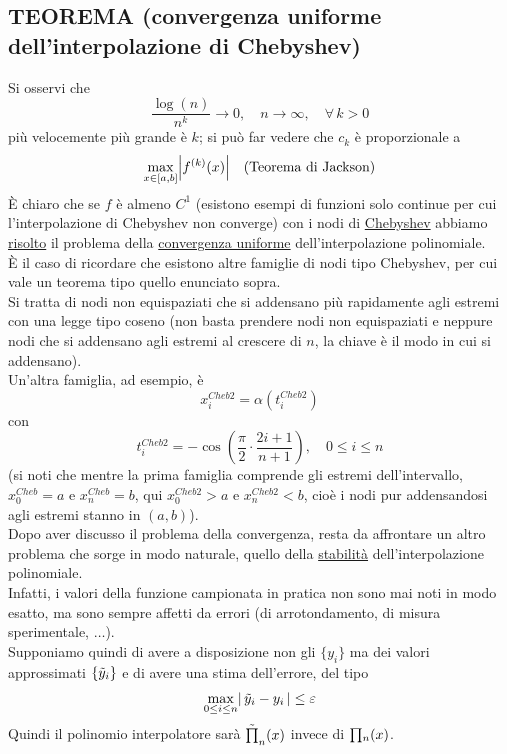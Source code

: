 \subsection{TEOREMA (convergenza uniforme dell'interpolazione di Chebyshev)}
\begin{center}
\end{center}
Si osservi che 
\[ \frac{\log (n)}{n^k} \to 0, \quad n \to \infty, \quad \forall \, k > 0 \]
più velocemente più grande è $k$; si può far vedere che $c_k$ è proporzionale a 
\[\max_{x \in [a,b]} \abs*{f^{(k)}(x)} \quad \text{(Teorema di Jackson)}\]
È chiaro che se $f$ è almeno $C^1$ (esistono esempi di funzioni solo continue per cui l'interpolazione di Chebyshev non converge) con i nodi di \uline{Chebyshev} abbiamo \uline{risolto} il problema della \uline{convergenza uniforme} dell'interpolazione polinomiale.\\
È il caso di ricordare che esistono altre famiglie di nodi tipo Chebyshev, per cui vale un teorema tipo quello enunciato sopra.\\
Si tratta di nodi non equispaziati che si addensano più rapidamente agli estremi con una legge tipo coseno (non basta prendere nodi non equispaziati e neppure nodi che si addensano agli estremi al crescere di $n$, la chiave è il modo in cui si addensano).\\
Un'altra famiglia, ad esempio, è
\[x_i^{Cheb2} = \alpha(t_i^{Cheb2})\] con
\[t_i^{Cheb2} = - \cos{\left(\frac{\pi}{2}\cdot \frac{2i+1}{n+1}\right)}, \quad 0 \le i \le n\]
(si noti che mentre la prima famiglia comprende gli estremi dell'intervallo, $x_0^{Cheb}=a$ e $x_n^{Cheb}=b$, qui $x_0^{Cheb2}>a$ e $x_n^{Cheb2}<b$, cioè i nodi pur addensandosi agli estremi stanno in $(a,b)$).\\
Dopo aver discusso il problema della convergenza, resta da affrontare un altro problema che sorge in modo naturale, quello della \uline{stabilità} dell'interpolazione polinomiale.\\
Infatti, i valori della funzione campionata in pratica non sono mai noti in modo esatto, ma sono sempre affetti da errori (di arrotondamento, di misura sperimentale, $\dotso$).\\
Supponiamo quindi di avere a disposizione non gli $\{y_i\}$ ma dei valori approssimati $\{\Tilde{y}_i\}$ e di avere una stima dell'errore, del tipo
\[\max_{0 \le i \le n} \abs*{\,\Tilde{y}_i - y_i\,} \le \varepsilon\]
Quindi il polinomio interpolatore sarà $\Tilde{\begin{matrix}\prod\end{matrix}}_n(x)$ invece di $\begin{matrix}\prod\end{matrix}_n(x)$.

